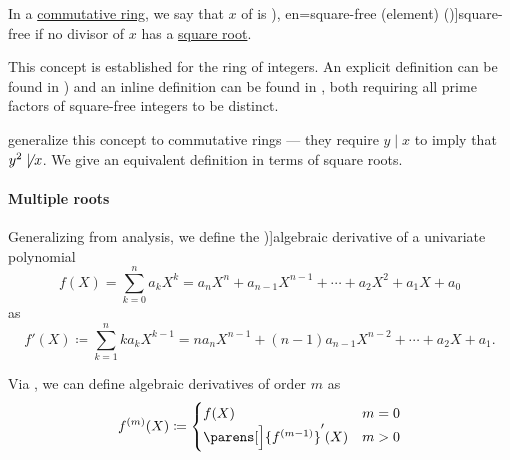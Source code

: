 \begin{definition}\label{def:square_free_element}\mimprovised
   In a \hyperref[def:ring/commutative]{commutative ring}, we say that \( x \) of is \term[ru=свободное от квадратов (число) (\cite[def. 93]{Бухштаб1966ТеорияЧисел}), en=square-free (element) (\cite[79]{JędrzejewiczEtAl2017SquareFreeFactorization})]{square-free} if no  divisor of \( x \) has a \hyperref[def:nth_root]{square root}.
\end{definition}
\begin{comments}
  \item This concept is established for the ring of integers. An explicit definition can be found in \cite[def. 93]{Бухштаб1966ТеорияЧисел}) and an inline definition can be found in \cite[176]{Birkhoff1967LatticeTheory}, both requiring all prime factors of square-free integers to be distinct.

   generalize this concept to commutative rings --- they require \( y \mid x \) to imply that \( y^2 \not\mid x \). We give an equivalent definition in terms of square roots.
\end{comments}

\paragraph{Multiple roots}

\begin{definition}\label{def:algebraic_derivative}
  Generalizing  from analysis, we define the \term[ru=производная (\cite[163]{Тыртышников2017ОсновыАлгебры})]{algebraic derivative} of a univariate polynomial
  \begin{equation*}
    f(X) = \sum_{k=0}^n a_k X^k = a_n X^n + a_{n-1} X^{n-1} + \cdots + a_2 X^2 + a_1 X + a_0
  \end{equation*}
  as
  \begin{equation*}
    f'(X) \coloneqq \sum_{k=1}^n k a_k X^{k-1} = n a_n X^{n-1} + (n-1) a_{n-1} X^{n-2} + \cdots + a_2 X + a_1.
  \end{equation*}

  Via , we can define algebraic derivatives of order \( m \) as
  \begin{equation*}
    f^{(m)}(X) \coloneqq \begin{cases}
      f(X)                             &m = 0 \\
      \parens[\Big]{ f^{(m - 1)} }'(X) &m > 0
    \end{cases}
  \end{equation*}
\end{definition}


